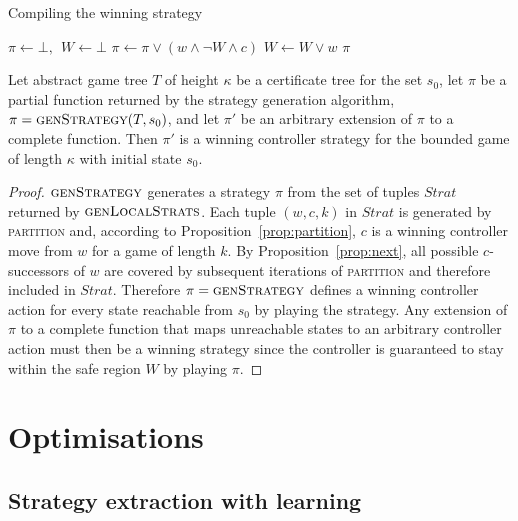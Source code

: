 \begin{algorithm}[t]
   \caption{Compiling the  winning strategy}\label{alg:compile}
   \begin{algorithmic}[1]
            \State $\pi \gets \bot,~~W \gets \bot$
            \State $\pi \gets \pi \lor (w \land \neg W \land c)$
                \State $W \gets W \lor w$
            \EndFor
            \State \Return $\pi$
        \EndFunction
    \end{algorithmic}
\end{algorithm}

\begin{theorem}\label{th:stratCorrectness}
Let abstract game tree $T$ of height $\kappa$ be a certificate tree for the set $s_0$, let $\pi$ be a partial function returned by the strategy generation algorithm, $\pi=\textsc{genStrategy}(T,s_0)$, and let $\pi'$ be an arbitrary extension of $\pi$ to a complete function.  Then $\pi'$ is a winning controller strategy for the bounded game of length $\kappa$ with initial state $s_0$.
\end{theorem}
\begin{proof}
    $\textsc{genStrategy}$ generates a strategy $\pi$ from the set of tuples $Strat$ returned by $\textsc{genLocalStrats}$. Each tuple $(w, c, k)$ in $Strat$ is generated by \textsc{partition} and, according to Proposition~\ref{prop:partition}, $c$ is a winning controller move from $w$ for a game of length $k$. By Proposition~\ref{prop:next}, all possible $c$-successors of $w$ are covered by subsequent iterations of \textsc{partition} and therefore included in $Strat$. Therefore $\pi = \textsc{genStrategy}$ defines a winning controller action for every state reachable from $s_0$ by playing the strategy. Any extension of $\pi$ to a complete function that maps unreachable states to an arbitrary controller action must then be a winning strategy since the controller is guaranteed to stay within the safe region $W$ by playing $\pi$.
\end{proof}

\section{Optimisations}

\subsection{Strategy extraction with learning}

